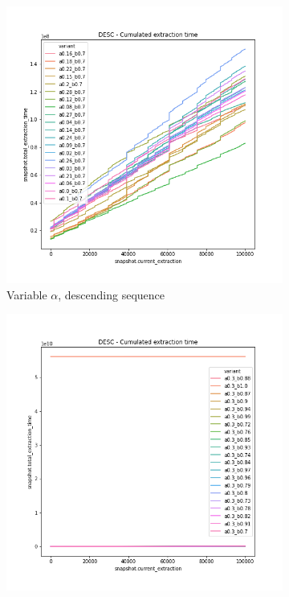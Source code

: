\begin{figure}
    \centering
    \begin{subfigure}[b]{0.32\textwidth}
        \centering
        \includegraphics[width=\textwidth]{./fragments/04_experimental_execution/images/04_alphabeta_detail_decreasing_left.png.0_0.png}
        \caption{Variable $\alpha$, descending sequence}
        \label{FIG:05_ALPHABETA_BENCHMARK_DESC_LEFT}
    \end{subfigure}
    \hfill
    \begin{subfigure}[b]{0.32\textwidth}
        \centering
        \includegraphics[width=\textwidth]{./fragments/04_experimental_execution/images/04_alphabeta_detail_decreasing_right.png.0_0.png}

\end{subfigure}
\end{figure}
